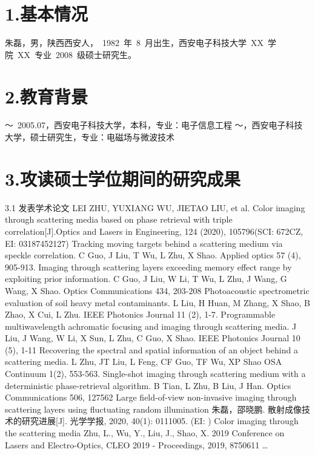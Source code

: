 
\begin{resume}

\section*{1.\hspace{0.75em}基本情况}
朱磊，男，陕西西安人，~1982~年~8~月出生，西安电子科技大学~XX~学院~XX~专业~2008~级硕士研究生。
\section*{2.\hspace{0.75em}教育背景}
\begin{resumelist*}
～~2005.07，西安电子科技大学，本科，专业：电子信息工程
～\hspace{3.5em}，西安电子科技大学，硕士研究生，专业：电磁场与微波技术
\end{resumelist*}

\section*{3.\hspace{0.75em}攻读硕士学位期间的研究成果}
\begin{resumelist}{\hspace{-0.25em}3.1\hspace{0.5em} 发表学术论文}
\resumelistitem LEI ZHU, YUXIANG WU, JIETAO LIU, et al. Color imaging through scattering media based on phase retrieval with triple correlation[J].Optics and Lasers in Engineering, 124 (2020), 105796(SCI: 672CZ, EI: 03187452127)
\resumelistitem Tracking moving targets behind a scattering medium via speckle correlation. C Guo, J Liu, T Wu, L Zhu, X Shao. Applied optics 57 (4), 905-913.
\resumelistitem Imaging through scattering layers exceeding memory effect range by exploiting prior information. C Guo, J Liu, W Li, T Wu, L Zhu, J Wang, G Wang, X Shao. Optics Communications 434, 203-208
\resumelistitem Photoacoustic spectrometric evaluation of soil heavy metal contaminants. L Liu, H Huan, M Zhang, X Shao, B Zhao, X Cui, L Zhu. IEEE Photonics Journal 11 (2), 1-7.
\resumelistitem Programmable multiwavelength achromatic focusing and imaging through scattering media. J Liu, J Wang, W Li, X Sun, L Zhu, C Guo, X Shao. IEEE Photonics Journal 10 (5), 1-11
\resumelistitem Recovering the spectral and spatial information of an object behind a scattering media. L Zhu, JT Liu, L Feng, CF Guo, TF Wu, XP Shao
OSA Continuum 1(2), 553-563.
\resumelistitem Single-shot imaging through scattering medium with a deterministic phase-retrieval algorithm. B Tian, L Zhu, B Liu, J Han.  Optics Communications 506, 127562
\resumelistitem Large field-of-view non-invasive imaging through scattering layers using fluctuating random illumination
\resumelistitem 朱磊，邵晓鹏. 散射成像技术的研究进展[J]. 光学学报, 2020, 40(1): 0111005. (EI:    )
\resumelistitem Color imaging through the scattering media
Zhu, L., Wu, Y., Liu, J., Shao, X. 2019 Conference on Lasers and Electro-Optics, CLEO 2019 - Proceedings, 2019, 8750611
\resumelistitem \ldots
\end{resumelist}


\end{resume}
